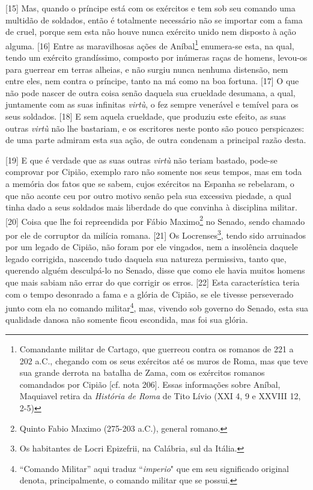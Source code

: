 {[}15{]} Mas, quando o príncipe está com os exércitos e tem sob seu
comando uma multidão de soldados, então é totalmente necessário não se
importar com a fama de cruel, porque sem esta não houve nunca exército
unido nem disposto à ação alguma. {[}16{]} Entre as maravilhosas ações
de Aníbal\footnote{Comandante militar de Cartago, que guerreou contra os
  romanos de 221 a 202 a.C., chegando com os seus exércitos até os muros
  de Roma, mas que teve sua grande derrota na batalha de Zama, com os
  exércitos romanos comandados por Cipião {[}cf. nota 206{]}. Essas
  informações sobre Aníbal, Maquiavel retira da \emph{História de Roma}
  de Tito Lívio (XXI 4, 9 e XXVIII 12, 2-5)} enumera-se esta, na qual,
tendo um exército grandíssimo, composto por inúmeras raças de homens,
levou-os para guerrear em terras alheias, e não surgiu nunca nenhuma
distensão, nem entre eles, nem contra o príncipe, tanto na má como na
boa fortuna. {[}17{]} O que não pode nascer de outra coisa senão daquela
sua crueldade desumana, a qual, juntamente com as suas infinitas
\emph{virtù}, o fez sempre venerável e temível para os seus soldados.
{[}18{]} E sem aquela crueldade, que produziu este efeito, as suas
outras \emph{virtù} não lhe bastariam, e os escritores neste ponto são
pouco perspicazes: de uma parte admiram esta sua ação, de outra condenam
a principal razão desta.

{[}19{]} E que é verdade que as suas outras \emph{virtù} não teriam
bastado, pode-se comprovar por Cipião, exemplo raro não somente nos seus
tempos, mas em toda a memória dos fatos que se sabem, cujos exércitos na
Espanha se rebelaram, o que não aconte ceu por outro motivo senão pela
sua excessiva piedade, a qual tinha dado a seus soldados mais liberdade
do que convinha à disciplina militar. {[}20{]} Coisa que lhe foi
repreendida por Fábio Maximo\footnote{Quinto Fabio Maximo (275-203
  a.C.), general romano.} no Senado, sendo chamado por ele de corruptor
da milícia romana. {[}21{]} Os Locrenses\footnote{Os habitantes de Locri
  Epizefrii, na Calábria, sul da Itália.}, tendo sido arruinados por um
legado de Cipião, não foram por ele vingados, nem a insolência daquele
legado corrigida, nascendo tudo daquela sua natureza permissiva, tanto
que, querendo alguém desculpá-lo no Senado, disse que como ele havia
muitos homens que mais sabiam não errar do que corrigir os erros.
{[}22{]} Esta característica teria com o tempo desonrado a fama e a
glória de Cipião, se ele tivesse perseverado junto com ela no comando
militar\footnote{``Comando Militar'' aqui traduz ``\emph{imperio}" que
  em seu significado original denota, principalmente, o comando militar
  que se possui.}, mas, vivendo sob governo do Senado, esta sua
qualidade danosa não somente ficou escondida, mas foi sua glória.

